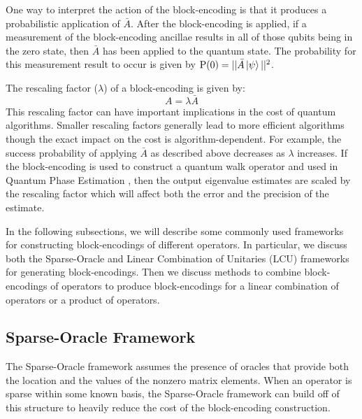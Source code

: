 One way to interpret the action of the block-encoding is that it produces a probabilistic application of $\bar{A}$.
After the block-encoding is applied, if a measurement of the block-encoding ancillae results in all of those qubits being in the zero state, then $\bar{A}$ has been applied to the quantum state.
The probability for this measurement result to occur is given by $\text{P}(0) = ||\bar{A} \ket{\psi}||^2$.

The rescaling factor ($\lambda$) of a block-encoding is given by:
\begin{equation}
    A = \lambda \bar{A}
\end{equation}
This rescaling factor can have important implications in the cost of quantum algorithms. 
Smaller rescaling factors generally lead to more efficient algorithms though the exact impact on the cost is algorithm-dependent.
For example, the success probability of applying $\bar{A}$ as described above decreases as $\lambda$ increases.
If the block-encoding is used to construct a quantum walk operator \cite{low2019hamiltonian, poulin2018quantum} and used in Quantum Phase Estimation \cite{poulin2018quantum, babbush2018encoding, lee2021even}, then the output eigenvalue estimates are scaled by the rescaling factor which will affect both the error and the precision of the estimate.

In the following subsections, we will describe some commonly used frameworks for constructing block-encodings of different operators.
In particular, we discuss both the Sparse-Oracle and Linear Combination of Unitaries (LCU) frameworks for generating block-encodings.
Then we discuss methods to combine block-encodings of operators to produce block-encodings for a linear combination of operators or a product of operators.

\subsection{Sparse-Oracle Framework}
\label{subsec:sparse-be}

The Sparse-Oracle framework \cite{berry2009black, childs2009universal, berry2015hamiltonian,berry2015simulating, low2017optimal,childs2017quantum,gilyen2019quantum} assumes the presence of oracles that provide both the location and the values of the nonzero matrix elements.
When an operator is sparse within some known basis, the Sparse-Oracle framework can build off of this structure to heavily reduce the cost of the block-encoding construction.

